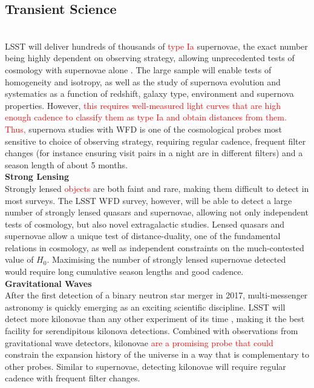 \documentclass[12pt, letterpaper]{article}
\newcommand{\review}[1]{{\textcolor{red}{#1}}}
\begin{document}
\subsection{Transient Science}
\hspace{\parindent}{\bf Supernovae}\\
LSST will deliver hundreds of thousands of \review{type Ia} supernovae, the exact number being highly dependent on observing strategy, allowing unprecedented tests of cosmology with supernovae alone \cite{lsst2009}.
The large sample will enable tests of homogeneity and isotropy, as well as the study of supernova evolution and systematics as a function of redshift, galaxy type, environment and supernova properties. However, \review{this requires well-measured light curves that are high enough cadence to classify them as type Ia and obtain distances from them. Thus,} supernova studies with WFD is one of the cosmological probes most sensitive to choice of observing strategy, requiring regular cadence, frequent filter changes (for instance ensuring visit pairs in a night are in different filters) and a season length of about 5 months.\\

{\bf Strong Lensing}\\
Strongly lensed \review{objects} are both faint and rare, making them difficult to detect in most surveys. The LSST WFD survey, however, will be able to detect a large number of strongly lensed quasars and supernovae, allowing not only independent tests of cosmology, but also novel extragalactic studies. Lensed quasars and supernovae allow a unique test of distance-duality, one of the fundamental relations in cosmology, as well as independent constraints on the much-contested value of $H_0$. Maximising the number of strongly lensed supernovae detected would require long cumulative season lengths and good cadence.\\

{\bf Gravitational Waves}\\
After the first detection of a binary neutron star merger in 2017, multi-messenger astronomy is quickly emerging as an exciting scientific discipline. LSST will detect more kilonovae than any other experiment of its time \cite{scolnic2017}, making it the best facility for serendipitous kilonova detections. Combined with observations from gravitational wave detectors, kilonovae \review{are a promising probe that could} constrain the expansion history of the universe in a way that is complementary to other probes. Similar to supernovae, detecting kilonovae will require regular cadence with frequent filter changes.
\end{document}
